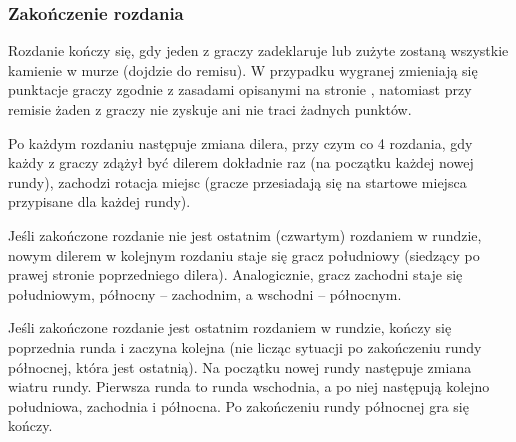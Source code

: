 

\subsubsection{Zakończenie rozdania}
Rozdanie kończy się, gdy jeden z graczy zadeklaruje  lub zużyte
zostaną wszystkie kamienie w murze (dojdzie do remisu). W przypadku wygranej
zmieniają się punktacje graczy zgodnie z zasadami opisanymi na stronie
\pageref{punktacja}, natomiast przy remisie żaden z graczy nie zyskuje ani nie
traci żadnych punktów. 

Po każdym rozdaniu następuje zmiana dilera, przy czym co 4 rozdania, gdy każdy z
graczy zdążył być dilerem dokładnie raz (na początku każdej nowej rundy),
zachodzi rotacja miejsc (gracze przesiadają się na startowe miejsca przypisane
dla każdej rundy).

Jeśli zakończone rozdanie nie jest ostatnim (czwartym) rozdaniem w rundzie,
nowym dilerem w kolejnym rozdaniu staje się gracz południowy (siedzący po
prawej stronie poprzedniego dilera). Analogicznie, gracz zachodni staje się
południowym, północny -- zachodnim, a wschodni -- północnym.

Jeśli zakończone rozdanie jest ostatnim rozdaniem w rundzie, kończy się
poprzednia runda i zaczyna kolejna (nie licząc sytuacji po zakończeniu rundy
północnej, która jest ostatnią). Na początku nowej rundy następuje zmiana wiatru
rundy. Pierwsza runda to runda wschodnia, a po niej następują kolejno
południowa, zachodnia i północna. Po zakończeniu rundy północnej gra się kończy.

